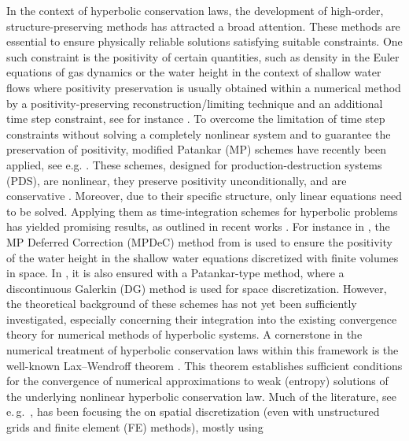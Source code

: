 \documentclass[final,11pt, times, linenumber, nopreprintline]{elsarticle}
\begin{document}
In the context of hyperbolic conservation laws, the development of high-order, structure-preserving methods has attracted a broad attention. These methods are essential to ensure physically reliable solutions satisfying suitable constraints. One such constraint is the positivity of certain quantities, such as density in the Euler equations of gas dynamics or the water height in the context of shallow water flows where positivity preservation is usually obtained within a numerical method by a positivity-preserving reconstruction/limiting technique and an additional time step constraint,  see for instance \cite{zbMATH07745801, RB2009, ABBKP2004}. 
To overcome the limitation of time step constraints without solving a completely nonlinear system and to guarantee the preservation of positivity, modified Patankar (MP) schemes have recently been applied, see e.g. \cite{ciallella2022arbitrary,huang2019third,ciallella2025high}. These schemes, designed for production-destruction systems (PDS), are nonlinear, they preserve positivity unconditionally, and are conservative \cite{burchard_high-order_2003, offner2020arbitrary}. 
Moreover, due to their specific structure, only linear equations need to be solved. Applying them as time-integration schemes for hyperbolic problems has yielded promising results, as outlined in recent works \cite{MO2014,Ortleb2014, OrtlebH2017}.
For instance in \cite{ciallella2022arbitrary,ciallella2025high}, the MP Deferred Correction (MPDeC) method from \cite{offner2020arbitrary} is used to ensure the positivity of the water height in the shallow water equations discretized with finite volumes in space.
In \cite{MO2014,Ortleb2014}, it is also ensured with a Patankar-type method, where a discontinuous Galerkin (DG) method is used for space discretization. 
However, the theoretical background of these schemes has not yet been sufficiently investigated, especially concerning their integration into the existing convergence theory for numerical methods of hyperbolic systems. 
A cornerstone in the numerical treatment of hyperbolic conservation laws within this framework is the well-known Lax--Wendroff theorem \cite{lax_systems_1960}. 
This theorem establishes sufficient conditions for the convergence of numerical approximations to weak (entropy) solutions of the underlying nonlinear hyperbolic conservation law. 
Much of the literature, see e.\,g.\ \cite{abgrall2023, eymard2022finite, kuzmin2022limiter,shi_2018_local, GRP_2024, arXiv:2308.14872,Weak_FV_2019,SS2018,zbMATH07745801}, has been focusing the on spatial discretization (even with unstructured grids and finite element (FE) methods), mostly using %
\end{document}
